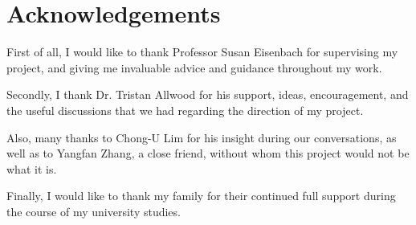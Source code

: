 \chapter*{Acknowledgements}

First of all, I would like to thank Professor Susan Eisenbach for supervising my project, and giving me invaluable advice and guidance throughout my work.

Secondly, I thank Dr. Tristan Allwood for his support, ideas, encouragement, and the useful discussions that we had regarding the direction of my project.

Also, many thanks to Chong-U Lim for his insight during our conversations, as well as to Yangfan Zhang, a close friend, without whom this project would not be what it is.

Finally, I would like to thank my family for their continued full support during the course of my university studies.
